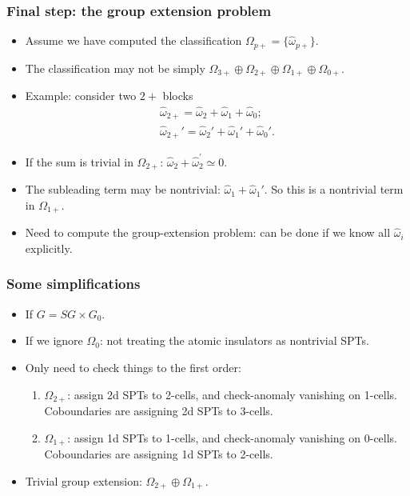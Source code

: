 \documentclass[xcolor=table, 10pt, aspectratio=43]{beamer}
\begin{document}
\begin{frame}
\frametitle{Final step: the group extension problem}
\begin{itemize}
\item Assume we have computed the classification $\Omega_{p+}=\{\hat\omega_{p+}\}$.
\item The classification may not be simply $\Omega_{3+}\oplus\Omega_{2+}\oplus \Omega_{1+} \oplus \Omega_{0+} $.
\item Example: consider two $2+$ blocks
\begin{align*}
\hat\omega_{2+}=\hat\omega_2+\hat\omega_1+\hat\omega_0;\\
\hat\omega_{2+}'=\hat\omega_2'+\hat\omega_1'+\hat\omega_0'.
\end{align*}
\item If the sum is trivial in $\Omega_{2+}$: $\hat\omega_2+\hat\omega_2^\prime\simeq0$.
\item The subleading term may be nontrivial: $\hat\omega_1+\hat\omega_1'$. So this is a nontrivial term in $\Omega_{1+}$.
\item Need to compute the group-extension problem: can be done if we know all $\hat\omega_i$ explicitly.
\end{itemize}
\end{frame}

\begin{frame}
\frametitle{Some simplifications}
\begin{itemize}
\item If $G = SG\times G_0$.
\item If we ignore $\Omega_0$: not treating the atomic insulators as nontrivial SPTs.
\item Only need to check things to the first order:
\begin{enumerate}
\item $\Omega_{2+}$: assign 2d SPTs to 2-cells, and check-anomaly vanishing on 1-cells. Coboundaries are assigning 2d SPTs to 3-cells.
\item $\Omega_{1+}$: assign 1d SPTs to 1-cells, and check-anomaly vanishing on 0-cells. Coboundaries are assigning 1d SPTs to 2-cells.
\end{enumerate}
\item Trivial group extension: $\Omega_{2+}\oplus\Omega_{1+}$.
\end{itemize}
\end{frame}
\end{document}
